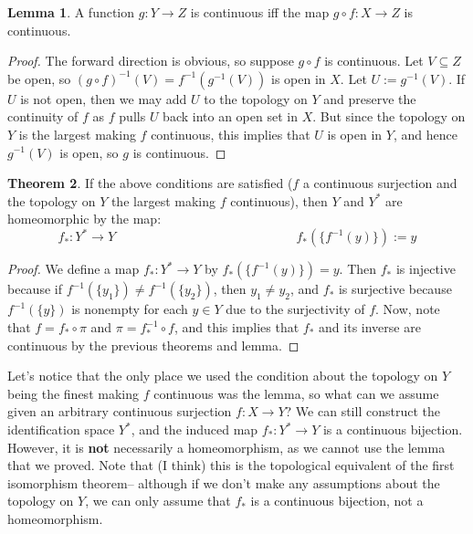 \documentclass[11pt, oneside]{amsart}   	%
\theoremstyle{definition}
\newtheorem{theorem}{Theorem}[section]
\newtheorem{lemma}[theorem]{Lemma}
\begin{document}
	\begin{lemma}
		A function $g : Y\rightarrow Z$ is continuous iff the map $g\circ f : X\rightarrow Z$ is continuous.
	\end{lemma}
	
	\begin{proof}
		The forward direction is obvious, so suppose $g\circ f$ is continuous. Let $V\subseteq Z$ be open, so $(g\circ f)^{-1}(V) = f^{-1}(g^{-1}(V))$ is open 
		in $X$. Let $U := g^{-1}(V)$. If $U$ is not open, then we may add $U$ to the topology on $Y$ and preserve the continuity of $f$ as $f$ pulls $U$ 
		back into an open set in $X$. But since the topology on $Y$ is the largest making $f$ continuous, this implies that $U$ is open in $Y$, and hence 
		$g^{-1}(V)$ is open, so $g$ is continuous.
	\end{proof}
	
	\begin{theorem}
		If the above conditions are satisfied ($f$ a continuous surjection and the topology on $Y$ the largest making $f$ continuous), then $Y$ and $Y^*$ 
		are homeomorphic by the map:
		$$
			f_* : Y^*\rightarrow Y \;\;\;\;\;\;\;\;\;\;\;\;\;\;\;\;\;\;\;\;\;\;\;\;\;\;\;\;\;\;\;\;\;\;\;\;\;\;\;\;\;\;\;\;\;\;\;\;\;\;\; f_*(\{f^{-1}(y)\}) := y
		$$
	\end{theorem}
	
	\begin{proof}
		We define a map $f_* : Y^*\rightarrow Y$ by $f_*(\{f^{-1}(y)\}) = y$. Then $f_*$ is injective because if $f^{-1}(\{y_1\})\neq f^{-1}(\{y_2\})$, then $y_1\neq 
		y_2$, and $f_*$ is surjective because $f^{-1}(\{y\})$ is nonempty for each $y\in Y$ due to the surjectivity of $f$. Now, note that $f = f_*\circ\pi$ and 
		$\pi = f_*^{-1}\circ f$, and this implies that $f_*$ and its inverse are continuous by the previous theorems and lemma.
	\end{proof}
	
	Let's notice that the only place we used the condition about the topology on $Y$ being the finest making $f$ continuous was the lemma, so what can we 
	assume given an arbitrary continuous surjection $f : X\rightarrow Y$? We can still construct the identification space $Y^*$, and the induced map $f_* : Y^*
	\rightarrow Y$ is a continuous bijection. However, it is \textbf{not} necessarily a homeomorphism, as we cannot use the lemma that we proved. Note 
	that (I think) this is the topological equivalent of the first isomorphism theorem-- although if we don't make any assumptions about the topology on $Y$, 
	we can only assume that $f_*$ is a continuous bijection, not a homeomorphism.
	
\end{document}
